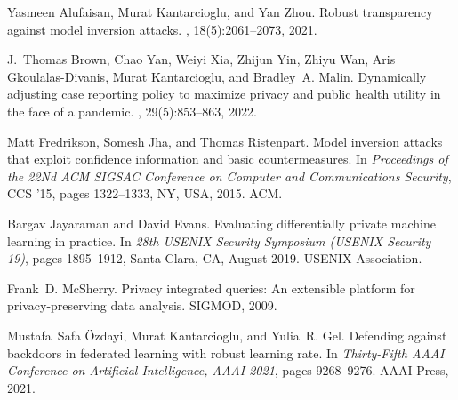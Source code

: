 \documentclass{article}
\begin{document}

%
\begin{thebibliography}{1}

Yasmeen Alufaisan, Murat Kantarcioglu, and Yan Zhou.
\newblock Robust transparency against model inversion attacks.
, 18(5):2061--2073,
  2021.

J.~Thomas Brown, Chao Yan, Weiyi Xia, Zhijun Yin, Zhiyu Wan, Aris
  Gkoulalas{-}Divanis, Murat Kantarcioglu, and Bradley~A. Malin.
\newblock Dynamically adjusting case reporting policy to maximize privacy and
  public health utility in the face of a pandemic.
, 29(5):853--863, 2022.

Matt Fredrikson, Somesh Jha, and Thomas Ristenpart.
\newblock Model inversion attacks that exploit confidence information and basic
  countermeasures.
\newblock In {\em Proceedings of the 22Nd ACM SIGSAC Conference on Computer and
  Communications Security}, CCS '15, pages 1322--1333, NY, USA, 2015. ACM.

Bargav Jayaraman and David Evans.
\newblock Evaluating differentially private machine learning in practice.
\newblock In {\em 28th {USENIX} Security Symposium ({USENIX} Security 19)},
  pages 1895--1912, Santa Clara, CA, August 2019. {USENIX} Association.

Frank~D. McSherry.
\newblock Privacy integrated queries: An extensible platform for
  privacy-preserving data analysis.
\newblock SIGMOD, 2009.

Mustafa~Safa {\"{O}}zdayi, Murat Kantarcioglu, and Yulia~R. Gel.
\newblock Defending against backdoors in federated learning with robust
  learning rate.
\newblock In {\em Thirty-Fifth {AAAI} Conference on Artificial Intelligence,
  {AAAI} 2021}, pages 9268--9276. {AAAI} Press, 2021.

\end{thebibliography}
\end{document}
